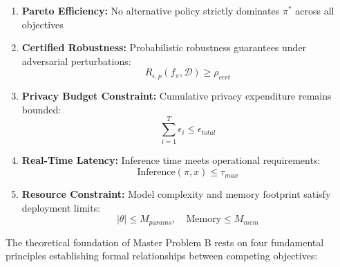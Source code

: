 \begin{enumerate}[label=(\roman*), leftmargin=2em]
\item \textbf{Pareto Efficiency:} No alternative policy strictly dominates $\pi^*$ across all objectives
\item \textbf{Certified Robustness:} Probabilistic robustness guarantees under adversarial perturbations:
\begin{equation}
R_{\epsilon,p}(f_\pi, \mathcal{D}) \geq \rho_{cert}
\end{equation}

\item \textbf{Privacy Budget Constraint:} Cumulative privacy expenditure remains bounded:
\begin{equation}
\sum_{i=1}^T \epsilon_i \leq \epsilon_{total}
\end{equation}

\item \textbf{Real-Time Latency:} Inference time meets operational requirements:
\begin{equation}
\text{Inference}(\pi, x) \leq \tau_{max}
\end{equation}

\item \textbf{Resource Constraint:} Model complexity and memory footprint satisfy deployment limits:
\begin{equation}
|\theta| \leq M_{params}, \quad \text{Memory} \leq M_{mem}
\end{equation}
\end{enumerate}

The theoretical foundation of Master Problem B rests on four fundamental principles establishing formal relationships between competing objectives:

